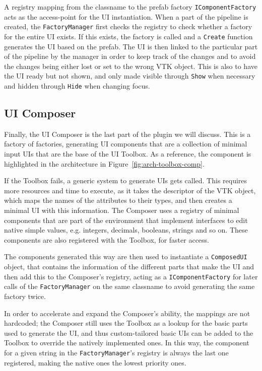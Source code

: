 A registry mapping from the classname to the prefab factory \verb|IComponentFactory| acts as the access-point for the UI instantiation. When a part of the pipeline is created, the \verb|FactoryManager| first checks the registry to check whether a factory for the entire UI exists. If this exists, the factory is called and a \verb|Create| function generates the UI based on the prefab. The UI is then linked to the particular part of the pipeline by the manager in order to keep track of the changes and to avoid the changes being either lost or set to the wrong VTK object. This is also to have the UI ready but not shown, and only made visible through \verb|Show| when necessary and hidden through \verb|Hide| when changing focus.

\subsection{UI Composer}
\label{sec:design-uicomposer}

Finally, the UI Composer is the last part of the plugin we will discuss. This is a factory of factories, generating UI components that are a collection of minimal input UIs that are the base of the UI Toolbox. As a reference, the component is highlighted in the architecture in Figure~\ref{fig:arch-toolbox-comp}.

If the Toolbox fails, a generic system to generate UIs gets called. This requires more resources and time to execute, as it takes the descriptor of the VTK object, which maps the names of the attributes to their types, and then creates a minimal UI with this information. The Composer uses a registry of minimal components that are part of the environment that implement interfaces to edit native simple values, e.g. integers, decimals, booleans, strings and so on. These components are also registered with the Toolbox, for faster access.

The components generated this way are then used to instantiate a \verb|ComposedUI| object, that contains the information of the different parts that make the UI and then add this to the Composer's registry, acting as a \verb|IComponentFactory| for later calls of the \verb|FactoryManager| on the same classname to avoid generating the same factory twice.

In order to accelerate and expand the Composer's ability, the mappings are not hardcoded; the Composer still uses the Toolbox as a lookup for the basic parts used to generate the UI, and thus custom-tailored basic UIs can be added to the Toolbox to override the natively implemented ones. In this way, the component for a given string in the \verb|FactoryManager|'s registry is always the last one registered, making the native ones the lowest priority ones.


